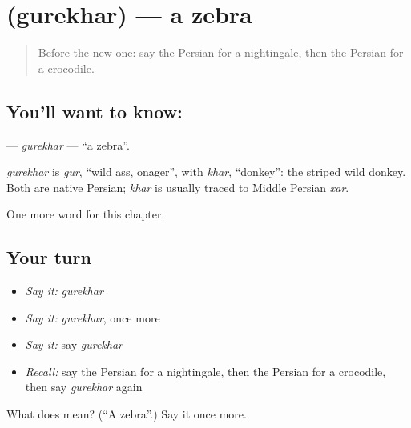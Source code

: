 \section[\texorpdfstring{\fa{گورخر} (gurekhar)}{گورخر (gurekhar)}]{ (gurekhar) — a zebra}

\label{lesson:FA-C209-gurekhar}



\begin{quote}
Before the new one: say the Persian for a nightingale, then the Persian for a crocodile.
\end{quote}

\subsection*{You'll want to know: }
\textbf{} — \emph{gurekhar} — \textquotedblleft{}a zebra\textquotedblright{}.

\begin{cousinweb}
\emph{gurekhar} is \emph{gur}, \textquotedblleft{}wild ass, onager\textquotedblright{}, with \emph{khar}, \textquotedblleft{}donkey\textquotedblright{}: the striped wild donkey. Both are native Persian; \emph{khar} is usually traced to Middle Persian \emph{xar}.
\end{cousinweb}

\begin{grammarlens}[title={What you've built}]
One more word for this chapter.
\end{grammarlens}

\subsection*{Your turn}
\begin{itemize}
\raggedright
  \item \emph{Say it:} \emph{gurekhar}
  \item \emph{Say it:} \emph{gurekhar}, once more
  \item \emph{Say it:} say \emph{gurekhar}
  \item \emph{Recall:} say the Persian for a nightingale, then the Persian for a crocodile, then say \emph{gurekhar} again
\end{itemize}

\begin{tcolorbox}[breakable,colback=teal!4,colframe=teal!35!black,title={Before you move on}]
What does  mean? (\textquotedblleft{}A zebra\textquotedblright{}.) Say it once more.
\end{tcolorbox}
